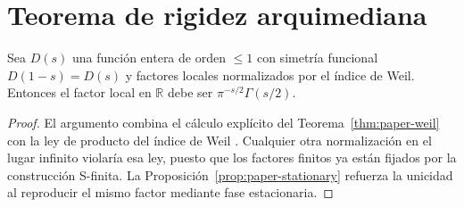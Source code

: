 \section{Teorema de rigidez arquimediana}

\begin{theorem}
Sea $D(s)$ una función entera de orden $\leqslant 1$ con simetría funcional
$D(1-s)=D(s)$ y factores locales normalizados por el índice de Weil.
Entonces el factor local en $\mathbb{R}$ debe ser $\pi^{-s/2}\Gamma(s/2)$.
\end{theorem}

\begin{proof}
El argumento combina el cálculo explícito del Teorema~\ref{thm:paper-weil} con la
ley de producto del índice de Weil \cite[Cor.~2]{Weil1964}.  Cualquier otra
normalización en el lugar infinito violaría esa ley, puesto que los factores
finitos ya están fijados por la construcción S-finita.  La
Proposición~\ref{prop:paper-stationary} refuerza la unicidad al reproducir el
mismo factor mediante fase estacionaria.
\end{proof}
